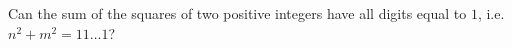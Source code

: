 Can the sum of the squares of two positive integers have all digits equal to $1$, i.e. $n^2+m^2=11\ldots1$?
